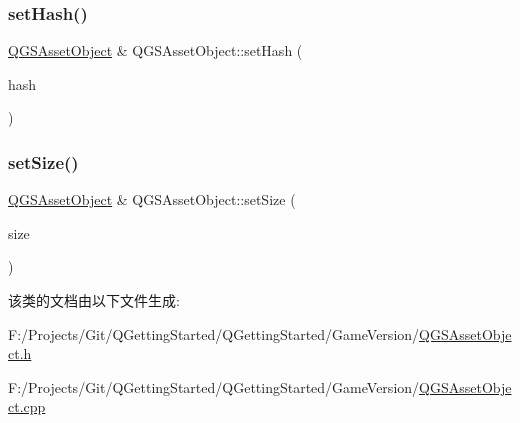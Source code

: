 \mbox{\label{class_q_g_s_asset_object_ad86ed9751f2c0a1e3905aa68b96f452a}} 
\subsubsection{\texorpdfstring{set\+Hash()}{setHash()}}
{\footnotesize\ttfamily \mbox{\hyperlink{class_q_g_s_asset_object}{Q\+G\+S\+Asset\+Object}} \& Q\+G\+S\+Asset\+Object\+::set\+Hash (\begin{DoxyParamCaption}\item[{const Q\+String \&}]{hash }\end{DoxyParamCaption})}

\mbox{\label{class_q_g_s_asset_object_afed3a4ec141f6e1f48cbe3129601f2d7}} 
\subsubsection{\texorpdfstring{set\+Size()}{setSize()}}
{\footnotesize\ttfamily \mbox{\hyperlink{class_q_g_s_asset_object}{Q\+G\+S\+Asset\+Object}} \& Q\+G\+S\+Asset\+Object\+::set\+Size (\begin{DoxyParamCaption}\item[{const qint64}]{size }\end{DoxyParamCaption})}



该类的文档由以下文件生成\+:\begin{DoxyCompactItemize}
\item 
F\+:/\+Projects/\+Git/\+Q\+Getting\+Started/\+Q\+Getting\+Started/\+Game\+Version/\mbox{\hyperlink{_q_g_s_asset_object_8h}{Q\+G\+S\+Asset\+Object.\+h}}\item 
F\+:/\+Projects/\+Git/\+Q\+Getting\+Started/\+Q\+Getting\+Started/\+Game\+Version/\mbox{\hyperlink{_q_g_s_asset_object_8cpp}{Q\+G\+S\+Asset\+Object.\+cpp}}\end{DoxyCompactItemize}
